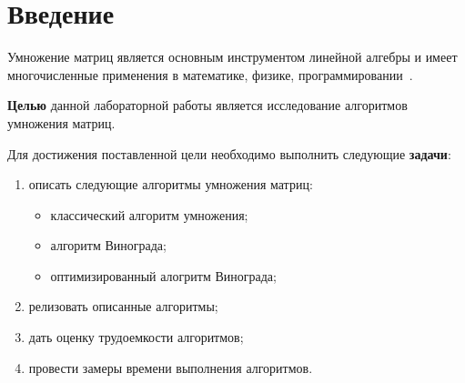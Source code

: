 \chapter*{Введение}

Умножение матриц является основным инструментом линейной алгебры и имеет многочисленные применения в математике, физике, программировании~\cite{vinograd-haskell}. 

\textbf{Целью} данной лабораторной работы является исследование алгоритмов умножения матриц.

Для достижения поставленной цели необходимо выполнить следующие \textbf{задачи}:
\begin{enumerate}[label={\arabic*)}]
    \item описать следующие алгоритмы умножения матриц:
        \begin{itemize}
            \item классический алгоритм умножения;
            \item алгоритм Винограда;
            \item оптимизированный алогритм Винограда;
        \end{itemize}
    \item релизовать описанные алгоритмы;
    \item дать оценку трудоемкости алгоритмов;
    \item провести замеры времени выполнения алгоритмов.
\end{enumerate}